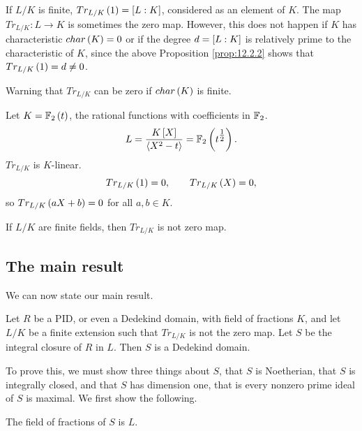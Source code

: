 \begin{remark1}
If $ L / K $ is finite, $ Tr_{L / K}\rb{1} = \sb{L : K} $, considered as an element of $ K $. The map $ Tr_{L / K} : L \to K $ is sometimes the zero map. However, this does not happen if $ K $ has characteristic $ char\rb{K} = 0 $ or if the degree $ d = \sb{L : K} $ is relatively prime to the characteristic of $ K $, since the above Proposition \ref{prop:12.2.2} shows that $ Tr_{L / K}\rb{1} = d \ne 0 $.
\end{remark1}

Warning that $ Tr_{L / K} $ can be zero if $ char\rb{K} $ is finite.

\begin{example2}
Let $ K = \F_2\rb{t} $, the rational functions with coefficients in $ \F_2 $.
$$ L = \dfrac{K\sb{X}}{\ab{X^2 - t}} = \F_2\rb{t^{\tfrac{1}{2}}}. $$
$ Tr_{L / K} $ is $ K $-linear.
$$ Tr_{L / K}\rb{1} = 0, \qquad Tr_{L / K}\rb{X} = 0, $$
so $ Tr_{L / K}\rb{aX + b} = 0 $ for all $ a, b \in K $.
\end{example2}

\begin{proposition}
If $ L / K $ are finite fields, then $ Tr_{L / K} $ is not zero map.
\end{proposition}

\subsection{The main result}

We can now state our main result.

\begin{theorem}
Let $ R $ be a PID, or even a Dedekind domain, with field of fractions $ K $, and let $ L / K $ be a finite extension such that $ Tr_{L / K} $ is not the zero map. Let $ S $ be the integral closure of $ R $ in $ L $. Then $ S $ is a Dedekind domain.
\end{theorem}

To prove this, we must show three things about $ S $, that $ S $ is Noetherian, that $ S $ is integrally closed, and that $ S $ has dimension one, that is every nonzero prime ideal of $ S $ is maximal. We first show the following.

\begin{lemma}
The field of fractions of $ S $ is $ L $.
\end{lemma}

